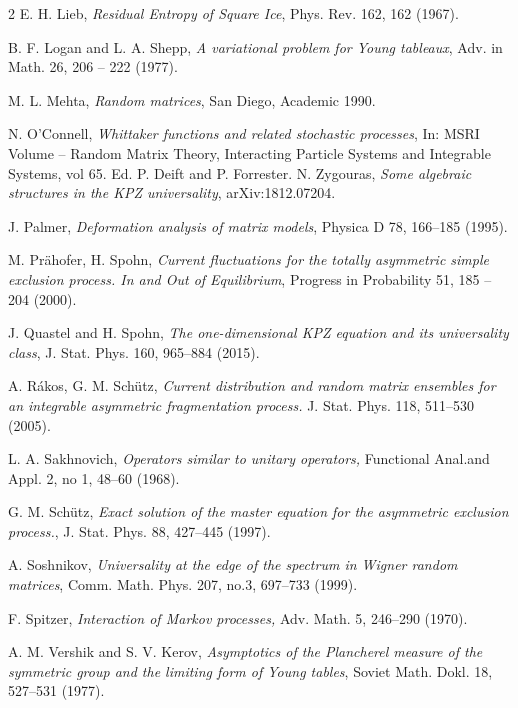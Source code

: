 \documentclass[11pt,letterpaper,reqno]{amsart}
\theoremstyle{definition}
\theoremstyle{remark}
\numberwithin{equation}{section}
\begin{document}
\begin{thebibliography}{2}
 E. H. Lieb, {\it Residual Entropy of Square Ice}, Phys. Rev. 162, 162 (1967).


 B. F. Logan and L. A. Shepp, {\it A variational problem for Young tableaux},
Adv. in Math. 26, 206 -- 222  (1977).

 M. L. Mehta, {\it Random matrices}, San Diego, Academic 1990.

 N. O'Connell, {\it Whittaker functions and related stochastic processes}, In: MSRI Volume -- Random Matrix Theory, Interacting Particle Systems and Integrable Systems, vol 65. Ed. P. Deift and P. Forrester.
 N. Zygouras, {\it Some algebraic structures in the KPZ universality}, arXiv:1812.07204.


 J. Palmer, \textit{Deformation analysis of matrix models}, Physica D 78, 166--185 (1995).

 M. Pr\"ahofer, H.  Spohn, {\it  Current fluctuations for the totally asymmetric simple
exclusion process. In and Out of Equilibrium}, Progress in Probability 51, 185 -- 204 (2000).


 J. Quastel and H. Spohn, {\it The one-dimensional KPZ equation and its universality class}, J. Stat. Phys. 160, 965--884 (2015).

 A. R\'akos, G. M. Sch\"utz, {\it Current distribution and random matrix ensembles for
an integrable asymmetric fragmentation process.} J. Stat. Phys. 118, 511--530 (2005).


 L. A. Sakhnovich, {\it Operators similar to unitary operators,} Functional Anal.and Appl. 2, no 1, 48--60 (1968).


 G. M. Sch\"utz, {\it Exact solution of the master equation for the asymmetric exclusion process.}, J. Stat. Phys. 88, 427--445 (1997).

 A. Soshnikov, {\it  Universality at the edge of the spectrum in Wigner random matrices}, Comm. Math.
Phys. 207, no.3,  697--733 (1999).


 F. Spitzer, {\it  Interaction of Markov processes,}  Adv. Math. 5, 246--290 (1970).

 A. M. Vershik and S. V. Kerov, {\it  Asymptotics of the Plancherel measure of the symmetric
group and the limiting form of Young tables}, Soviet Math. Dokl. 18,  527--531 (1977).


\end{thebibliography}
\end{document}
